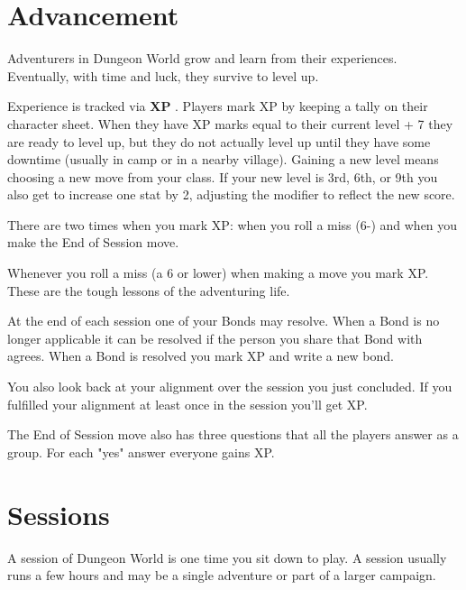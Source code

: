  
\section{Advancement}   
 

Adventurers in Dungeon World grow and learn from their experiences. Eventually, with time and luck, they survive to level up.

 

Experience is tracked via {\bf XP} . Players mark XP by keeping a tally on their character sheet. When they have XP marks equal to their current level + 7 they are ready to level up, but they do not actually level up until they have some downtime (usually in camp or in a nearby village). Gaining a new level means choosing a new move from your class. If your new level is 3rd, 6th, or 9th you also get to increase one stat by 2, adjusting the modifier to reflect the new score.

 

There are two times when you mark XP: when you roll a miss (6-) and when you make the End of Session move.

 

Whenever you roll a miss (a 6 or lower) when making a move you mark XP. These are the tough lessons of the adventuring life.

 

At the end of each session one of your Bonds may resolve. When a Bond is no longer applicable it can be resolved if the person you share that Bond with agrees. When a Bond is resolved you mark XP and write a new bond.

 

You also look back at your alignment over the session you just concluded. If you fulfilled your alignment at least once in the session you'll get XP.

 

The End of Session move also has three questions that all the players answer as a group. For each "yes" answer everyone gains XP.

 
\section{Sessions}   
 

A session of Dungeon World is one time you sit down to play. A session usually runs a few hours and may be a single adventure or part of a larger campaign.

